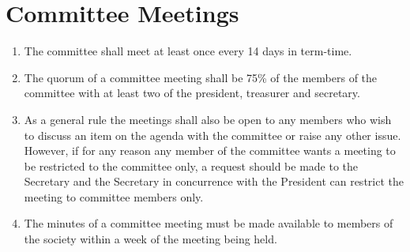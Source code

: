 \section{Committee Meetings}

\begin{enumerate}

  \item The committee shall meet at least once every 14 days in term-time.

  \item The quorum of a committee meeting shall be 75\% of the members of the
    committee with at least two of the president, treasurer and secretary.

  \item As a general rule the meetings shall also be open to any members who wish
    to discuss an item on the agenda with the committee or raise any other
    issue. However, if for any reason any member of the committee wants a
    meeting to be restricted to the committee only, a request should be made
    to the Secretary and the Secretary in concurrence with the President can
    restrict the meeting to committee members only.

  \item The minutes of a committee meeting must be made available to members
    of the society within a week of the meeting being held.

\end{enumerate}
